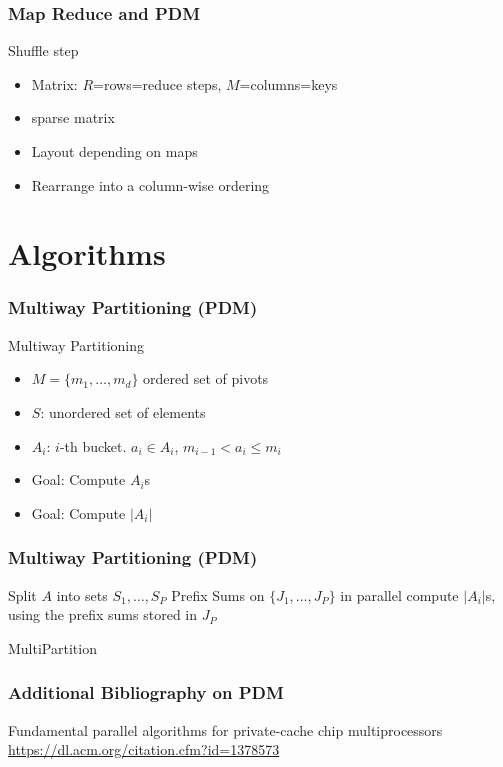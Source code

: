 \documentclass[12pt,aspectratio=169]{beamer}
\begin{document}
\begin{frame}\frametitle{Map Reduce and PDM}
  \begin{block}{Shuffle step}
  \begin{itemize}
  \item
    Matrix: $R$=rows=reduce steps, $M$=columns=keys
  \item
    sparse matrix
  \item
    Layout depending on maps
  \item
    Rearrange into a column-wise ordering
  \end{itemize}
\end{block}
\end{frame}



\section{Algorithms}


\begin{frame}\frametitle{Multiway Partitioning (PDM)}
  \begin{block}{Multiway Partitioning}
    \begin{itemize}
    \item
      $M=\{ m_{1}, \ldots , m_{d}\}$ ordered set of pivots
    \item
      $S$: unordered set of elements
    \item
      $A_{i}$: $i$-th bucket. $a_{i}\in A_{i}$, $m_{i-1}< a_{i} \le m_{i}$
    \item
      Goal: Compute $A_{i}$s
    \item
      Goal: Compute $|A_{i}|$
    \end{itemize}
  \end{block}
\end{frame}

\begin{frame}\frametitle{Multiway Partitioning (PDM)}
  \begin{algorithm}[H]
    Split $A$ into sets $S_{1}, \ldots , S_{P}$\;
    Prefix Sums on $\{J_{1}, \ldots , J_{P}\}$ in parallel\;
    compute $|A_{i}|$s, using the prefix sums stored in $J_{P}$
    \caption{MultiPartition}
  \end{algorithm}
\end{frame}

\begin{frame}\frametitle{Additional Bibliography on PDM}
  \small
Fundamental parallel algorithms for private-cache chip multiprocessors
\url{https://dl.acm.org/citation.cfm?id=1378573}
\end{frame}
\end{document}
